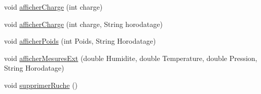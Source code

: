 \begin{DoxyCompactItemize}
void \hyperlink{classfr_1_1campus_1_1laurainc_1_1honeybee_1_1_dashboard_activity_a13e1d8016723e33b6245e9e3063c8a4f}{afficher\+Charge} (int charge)
\item 
void \hyperlink{classfr_1_1campus_1_1laurainc_1_1honeybee_1_1_dashboard_activity_a8e57cfad2c497ab377ee6b7133ca6f18}{afficher\+Charge} (int charge, String horodatage)
\item 
void \hyperlink{classfr_1_1campus_1_1laurainc_1_1honeybee_1_1_dashboard_activity_a13786896440cb102e03bd5ac4f54c3d8}{afficher\+Poids} (int Poids, String Horodatage)
\item 
void \hyperlink{classfr_1_1campus_1_1laurainc_1_1honeybee_1_1_dashboard_activity_a0aef24c78a074282c20938eb2a665c8b}{afficher\+Mesures\+Ext} (double Humidite, double Temperature, double Pression, String Horodatage)
\item 
void \hyperlink{classfr_1_1campus_1_1laurainc_1_1honeybee_1_1_dashboard_activity_ae77451bd85101ed42644c2421cd2234f}{supprimer\+Ruche} ()
\end{DoxyCompactItemize}
